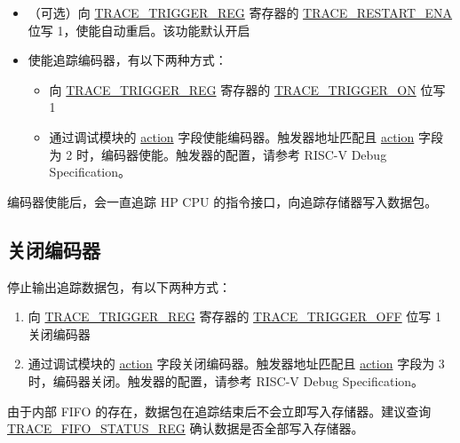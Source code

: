 \documentclass[main\_\_CN.tex]{subfiles}
\begin{document}
\begin{itemize}
    \item（可选）向 \hyperref[regdesc:TRACETRIGGERREG]{TRACE\_TRIGGER\_REG} 寄存器的 \hyperref[fielddesc:TRACERESTARTENA]{TRACE\_RESTART\_ENA} 位写 1，使能自动重启。该功能默认开启


    \item 使能追踪编码器，有以下两种方式：
        \begin{itemize}
            \item 向 \hyperref[regdesc:TRACETRIGGERREG]{TRACE\_TRIGGER\_REG} 寄存器的 \hyperref[fielddesc:TRACETRIGGERON]{TRACE\_TRIGGER\_ON} 位写 1
            \item 通过调试模块的 \hyperref[fielddesc:MCONTROLACTION]{action} 字段使能编码器。触发器地址匹配且 \hyperref[fielddesc:MCONTROLACTION]{action} 字段为 2 时，编码器使能。触发器的配置，请参考 RISC-V Debug Specification。
    \end{itemize}
\end{itemize}

编码器使能后，会一直追踪 HP CPU 的指令接口，向追踪存储器写入数据包。

\subsection{关闭编码器}

停止输出追踪数据包，有以下两种方式：
\begin{enumerate}
    \item 向 \hyperref[regdesc:TRACETRIGGERREG]{TRACE\_TRIGGER\_REG} 寄存器的 \hyperref[fielddesc:TRACETRIGGEROFF]{TRACE\_TRIGGER\_OFF} 位写 1 关闭编码器
    \item 通过调试模块的 \hyperref[fielddesc:MCONTROLACTION]{action} 字段关闭编码器。触发器地址匹配且 \hyperref[fielddesc:MCONTROLACTION]{action} 字段为 3 时，编码器关闭。触发器的配置，请参考 RISC-V Debug Specification。
\end{enumerate}

由于内部 FIFO 的存在，数据包在追踪结束后不会立即写入存储器。建议查询\hyperref[regdesc:TRACEFIFOSTATUSREG]{TRACE\_FIFO\_STATUS\_REG} 确认数据是否全部写入存储器。
\end{document}
